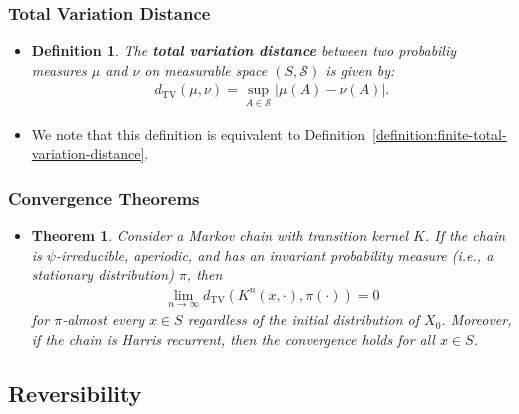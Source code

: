 \documentclass[10pt]{article}
\newtheorem{theorem}[lemma]{Theorem}
\newtheorem{definition}[lemma]{Definition}
\newcommand{\mrm}[1]{\mathrm{#1}}
\newcommand{\mcal}[1]{\mathcal{#1}}
\begin{document}
\subsubsection{Total Variation Distance}

\begin{itemize}
  \item \begin{definition}
    The {\bf total variation distance} between two probabiliy measures $\mu$ and $\nu$ on measurable space $(S,\mcal{S})$ is given by:
    \begin{align*}
      d_{\mrm{TV}}(\mu,\nu) = \sup_{A \in \mcal{S}} |\mu(A) - \nu(A)|.
    \end{align*}
  \end{definition}
  
  \item We note that this definition is equivalent to Definition~\ref{definition:finite-total-variation-distance}.
\end{itemize}

\subsubsection{Convergence Theorems}

\begin{itemize}
  \item \begin{theorem}
    Consider a Markov chain with transition kernel $K$. If the chain is $\psi$-irreducible, aperiodic, and has an invariant probability measure (i.e., a stationary distribution) $\pi$, then
    \begin{align*}
      \lim_{n \rightarrow \infty} d_{\mrm{TV}}(K^n(x, \cdot), \pi(\cdot)) = 0
    \end{align*}
    for $\pi$-almost every $x \in S$ regardless of the initial distribution of $X_0$. Moreover, if the chain is Harris recurrent, then the convergence holds for all $x \in S$.
  \end{theorem}  
\end{itemize}

\subsection{Reversibility}
\end{document}
